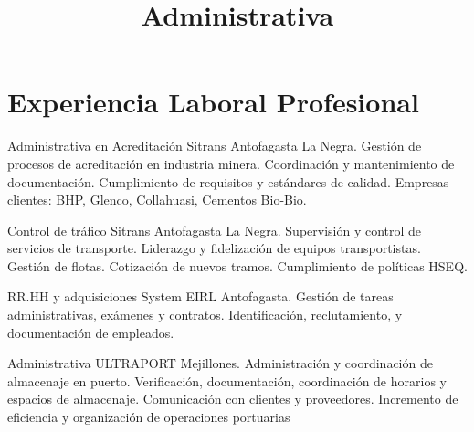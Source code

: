 \documentclass[draft,color,12pt,letterpaper,sans]{moderncv}
\title{Administrativa}
\begin{document}
\makecvtitle %

\section{Experiencia Laboral Profesional}

{Administrativa en Acreditación}
{\newline Sitrans}
{\newline Antofagasta}
{La Negra.}
{Gestión de procesos de acreditación en industria minera. 
\newline Coordinación y mantenimiento de documentación.
\newline Cumplimiento de requisitos y estándares de calidad.
\newline Empresas clientes: BHP, Glenco, Collahuasi, Cementos Bio-Bio.
\newline}

{Control de tráfico}
{\newline Sitrans}
{\newline Antofagasta}
{La Negra.}
{Supervisión y control de servicios de transporte.
\newline Liderazgo y fidelización de equipos transportistas. 
\newline Gestión de  flotas. Cotización de  nuevos tramos.
\newline Cumplimiento de políticas HSEQ.
\newline}

{RR.HH y adquisiciones}
{\newline System EIRL}
{\newline Antofagasta.}
{}
{Gestión de tareas administrativas, exámenes y contratos.
\newline Identificación, reclutamiento, y documentación de empleados.
\newline}

{Administrativa}
{\newline ULTRAPORT}
{\newline Mejillones.}
{}
{Administración y coordinación de almacenaje en puerto.
\newline Verificación, documentación, coordinación de horarios y espacios de almacenaje.
\newline Comunicación con clientes y proveedores.
\newline Incremento de eficiencia y organización de operaciones portuarias
\newline}
\end{document}
